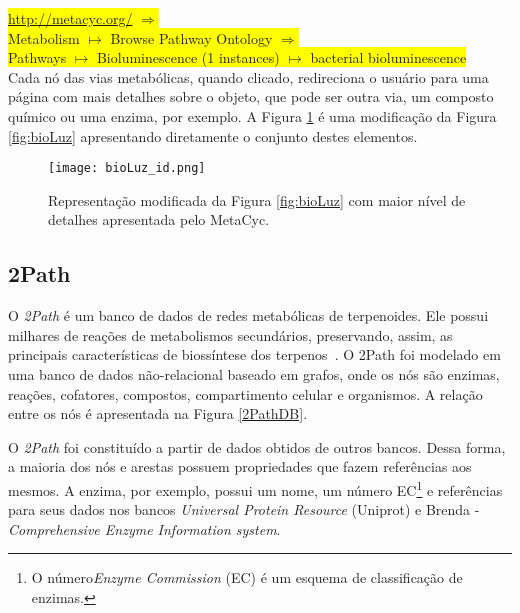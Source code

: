 \indent \colorbox{yellow}{\url{http://metacyc.org/} $\Rightarrow$} \\
\indent \colorbox{yellow}{Metabolism $\mapsto$ Browse Pathway Ontology $\Rightarrow$} \\
\indent \colorbox{yellow}{Pathways $\mapsto$ Bioluminescence (1 instances) $\mapsto$ bacterial bioluminescence} \\

\indent Cada nó das vias metabólicas, quando clicado, redireciona o usuário para uma página com mais detalhes sobre o objeto, que pode ser outra via, um composto químico ou uma enzima, por exemplo. A Figura \ref{bioLuz_id} é uma modificação da Figura \ref{fig:bioLuz} apresentando diretamente o conjunto destes elementos. \\
\newpage
\begin{figure}[!h]
\centering
\texttt{[image: bioLuz\_id.png]}
\caption{Representação modificada da Figura \ref{fig:bioLuz} com maior nível de detalhes apresentada pelo MetaCyc.}
\label{bioLuz_id}
\end{figure}
\break


\subsection{2Path}

\indent O \textit{2Path} é um banco de dados de redes metabólicas de terpenoides. Ele possui milhares de reações de metabolismos secundários, preservando, assim, as principais características de biossíntese dos terpenos~\cite{waldeyr}. O 2Path foi modelado em uma banco de dados não-relacional baseado em grafos, onde os nós são enzimas, reações, cofatores, compostos, compartimento celular e organismos. A relação entre os nós é apresentada na Figura \ref{2PathDB}.

\indent O \textit{2Path} foi constituído a partir de dados obtidos de outros bancos. Dessa forma, a maioria dos nós e arestas possuem propriedades que fazem referências aos mesmos. A enzima, por exemplo, possui um nome, um número EC\footnote{O número\textit{Enzyme Commission} (EC) é um esquema de classificação de enzimas.} e referências para seus dados nos bancos \textit{Universal Protein Resource} (Uniprot) e Brenda - \textit{Comprehensive Enzyme Information system}. 


